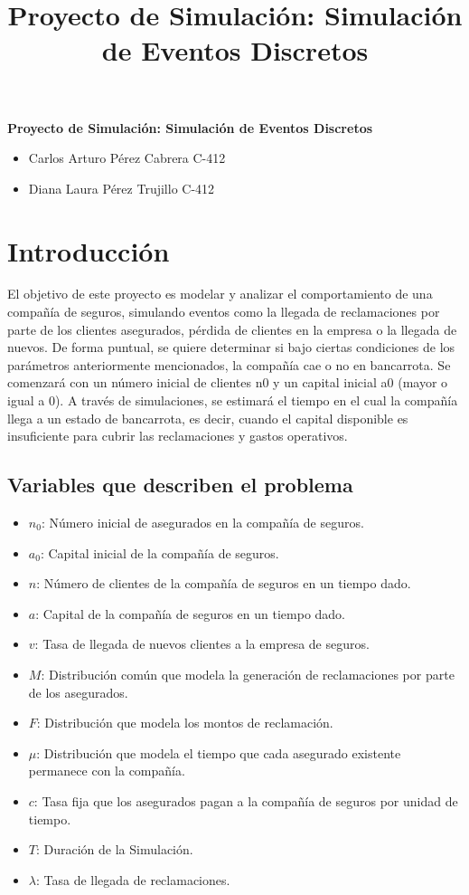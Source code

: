 \documentclass{article}
\title{Proyecto de Simulación: Simulación de Eventos Discretos}
\begin{document}
\begin{titlepage}
    \centering
{\bfseries\Huge Proyecto de Simulación: Simulación de Eventos Discretos \par}
\vspace{2cm}
\begin{itemize}
    \item {\large Carlos Arturo Pérez Cabrera C-412}
    \item {\large Diana Laura Pérez Trujillo C-412}
\end{itemize}

\end{titlepage}

\section{Introducción}

El objetivo de este proyecto es modelar y analizar el comportamiento de una compañía de seguros, simulando eventos como la llegada de reclamaciones por parte de los clientes asegurados, pérdida de clientes en la empresa o la llegada de nuevos. De forma puntual, se quiere determinar si bajo ciertas condiciones de los parámetros anteriormente mencionados, la compañía cae o no en bancarrota. Se comenzará con un número inicial de clientes n0 y un capital inicial a0 (mayor o igual a 0). A través de simulaciones, se estimará el tiempo en el cual la compañía llega a un estado de bancarrota, es decir, cuando el capital disponible es insuficiente para cubrir las reclamaciones y gastos operativos.

\subsection{Variables que describen el problema}
\begin{itemize}
    \item $n_0$: Número inicial de asegurados en la compañía de seguros.
    \item $a_0$: Capital inicial de la compañía de seguros.
    \item $n$: Número de clientes de la compañía de seguros en un tiempo dado.
    \item $a$: Capital de la compañía de seguros en un tiempo dado.
    \item $v$: Tasa de llegada de nuevos clientes a la empresa de seguros.
    \item $M$: Distribución común que modela la generación de reclamaciones por parte de los asegurados.
    \item $F$: Distribución que modela los montos de reclamación.
    \item $\mu$: Distribución que modela el tiempo que cada asegurado existente permanece con la compañía.
    \item $c$: Tasa fija que los asegurados pagan a la compañía de seguros por unidad de tiempo.
    \item $T$: Duración de la Simulación.
    \item $\lambda$: Tasa de llegada de reclamaciones.
\end{itemize}
\end{document}
